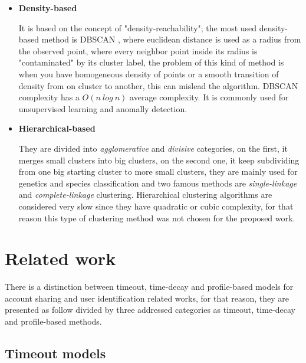 \documentclass[ecp,tc,english]{iiufrgs}
\begin{document}
\begin{itemize}
            \item \textbf{Density-based}
            
            It is based on the concept of "density-reachability"; the most used density-based method is DBSCAN \cite{ester1996}, where euclidean distance is used as a radius from the observed point, where every neighbor point inside its radius is "contaminated" by its cluster label, the problem of this kind of method is when you have homogeneous density of points or a smooth transition of density from on cluster to another, this can mislead the algorithm. DBSCAN complexity has a \(O(n\ log\ n)\) average complexity. It is commonly used for unsupervised learning and anomally detection.
            
            \item \textbf{Hierarchical-based}
            
            They are divided into \textit{agglomerative} and \textit{divisive} categories, on the first, it merges small clusters into big clusters, on the second one, it keep subdividing from one big starting cluster to more small clusters, they are mainly used for genetics and species classification and two famous methods are \textit{single-linkage} and \textit{complete-linkage} \cite{johnson1967, sibson1973} clustering. Hierarchical clustering algorithms are considered very slow since they have quadratic or cubic complexity, for that reason this type of clustering method was not chosen for the proposed work.
        \end{itemize}


\chapter{Related work} \label{related_works}
There is a distinction between timeout, time-decay and profile-based models for account sharing and user identification related works, for that reason, they are presented as follow divided by three addressed categories as timeout, time-decay and profile-based methods.

\section{Timeout models}
\end{document}
